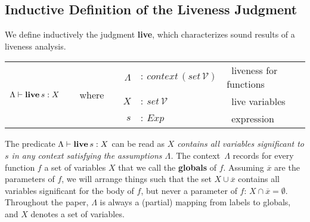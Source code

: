 \documentclass[openright,a4paper,11pt]{scrartcl}
\newcommand{\slist}[1]{\ensuremath{\overline{#1}}}
\newcommand{\M}[1]{\ensuremath{\mathit{#1}}}
\newcommand{\Exp}{\ensuremath{\M{Exp}}}
\newcommand{\Var}{\ensuremath{\mathcal{V}}}
\newcommand{\LC}{\ensuremath{\Lambda}}
\newcommand{\lv}{\ensuremath{X}}
\newcommand{\live}[3]{\ensuremath{#1\vdash\textbf{\textup{live}\,}{}#3:#2}}
\newcommand{\ndef}[1]{\textbf{#1}}
\theoremstyle{plain}
\theoremstyle{plain}
\theoremstyle{plain}
\theoremstyle{plain}
\theoremstyle{nonumberplain}
\begin{document}
\subsection{Inductive Definition of the Liveness Judgment}

We define inductively the judgment \ndef{live}, which characterizes sound results of a liveness analysis.
\begin{center}
\begin{tabular}{lcrll}
 \multirow{3}{*}{$\live{\LC}{\lv}{s}$}&
 \multirow{3}{*}{~~where~~}
 &$\LC$&$:~\textit{context}\,(\M{set}\,\Var)$&~liveness for functions\\
 &&$\lv$&$:~\M{set}\,\Var$&~live variables\\
 &&$s$&$:~\Exp$&~expression
\end{tabular}
\end{center}
The predicate $\live{\LC}{\lv}{s}$ can be read as
\textit{$\lv$ contains all variables significant to $s$ in any context satisfying the assumptions $\LC$.}
The context~$\LC$ records for every function $f$ a set of variables $\lv$ that we call the \ndef{globals} of $f$.
Assuming $\slist{x}$ are the parameters of $f$, we will arrange things such that the set $\lv\cup\slist{x}$ contains all variables significant for the body of $f$,
but never a parameter of $f$: $X\cap\slist{x}=\emptyset$.
Throughout the paper, $\LC$ is always a (partial) mapping from labels to globals,
and $\lv$ denotes a set of variables.
\end{document}
